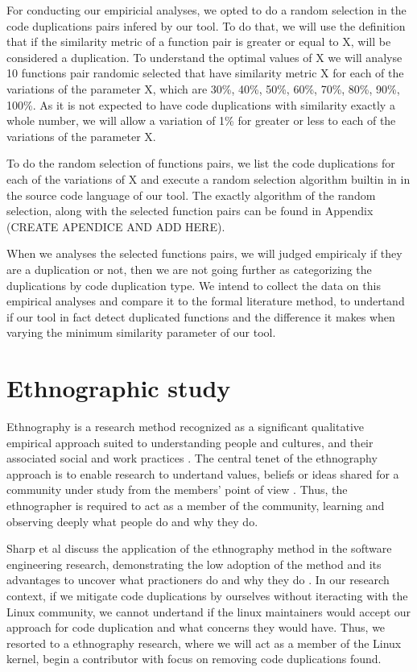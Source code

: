 For conducting our empiricial analyses, we opted to do a random selection in the code duplications pairs infered by our tool. To
do that, we will use the definition that if the similarity metric of a function pair is greater or equal to X, will be considered a
duplication. To understand the optimal values of X we will analyse 10 functions pair randomic selected 
that have similarity metric X for each of the variations of the parameter X, which are 
30\%, 40\%, 50\%, 60\%, 70\%, 80\%, 90\%, 100\%. 
As it is not expected to have code duplications with similarity exactly a whole number, we will allow a
variation of 1\% for greater or less to each of the variations of the parameter X. 

To do the random selection of functions pairs, we list the code duplications for each of the variations of X and execute 
a random selection algorithm
builtin in in the source code language of our tool. The exactly algorithm of the random selection, along with the selected 
function pairs can be found in Appendix (CREATE APENDICE AND ADD HERE).

When we analyses the selected functions pairs, we will judged empiricaly if they are a duplication or not, then we are not
going further as
categorizing the duplications by code duplication type. We intend to collect the data on this empirical analyses and compare it
to the formal literature method, to undertand if our tool in fact detect duplicated functions and 
the difference it makes when varying the minimum similarity parameter of our tool.

\section{Ethnographic study}

Ethnography is a research method recognized as a significant qualitative empirical approach 
suited to understanding people and cultures, and their associated social and work practices \citep{bookethno}. 
The central tenet of the ethnography approach is to enable research to undertand values, beliefs or ideas shared for a 
 community under study from the members' point of view \citep{ethnosoft}. Thus, the ethnographer is required to act as
a member of  the community, learning and observing deeply what people do and why they do.

Sharp et al discuss the application of the ethnography method in the software engineering research, demonstrating the low adoption 
of the method and its advantages to uncover what practioners do and why they do \citep{ethnosoft}. In our research context, if we
mitigate code duplications by ourselves without iteracting with the Linux community, we cannot undertand if the linux maintainers 
would accept our approach for code duplication and what concerns they would have. Thus, we resorted to a ethnography research, where
we will act as a member of the Linux kernel, begin a contributor with focus on removing code duplications found.

